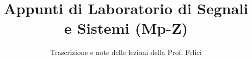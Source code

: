 \documentclass[a4paper,12pt]{article}
\title{Appunti di Laboratorio di Segnali e Sistemi (Mp-Z)}
\author{Trascrizione e note delle lezioni della Prof. Felici}
\date{}
\begin{document}
\maketitle
\projectintro
\tableofcontents
\newpage

\end{document}
